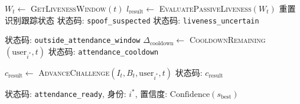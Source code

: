 \documentclass[UTF8]{heuthesis}
\begin{document}
\begin{algorithm}[htbp]
\begin{algorithmic}[1]
\Statex
{}
\State $W_t \gets$ \textsc{GetLivenessWindow}$(t)$
\State $l_{\mathrm{result}} \gets$ \textsc{EvaluatePassiveLiveness}$(W_t)$ 
    \State 重置识别跟踪状态
    \State \Return 状态码: \texttt{spoof\_suspected}
    \State \Return 状态码: \texttt{liveness\_uncertain}
\endIf

\Statex
{}
    \State \Return 状态码: \texttt{outside\_attendance\_window}
\endIf
\State $\Delta_{\mathrm{cooldown}} \gets$ \textsc{CooldownRemaining}$(\text{user}_{i^*}, t)$
    \State \Return 状态码: \texttt{attendance\_cooldown}
\endIf

\Statex
{}
    \State $c_{\mathrm{result}} \gets$ \textsc{AdvanceChallenge}$(I_t, B_t, \text{user}_{i^*}, t)$
        \State \Return 状态码: $c_{\mathrm{result}}$
    \endIf
\endIf

\Statex
{}
\State \Return 状态码: \texttt{attendance\_ready}, 身份: $i^*$, 置信度: $\text{Confidence}(s_{\mathrm{best}})$
\end{algorithmic}
\label{alg:terminal}
\end{algorithm}
\end{document}
